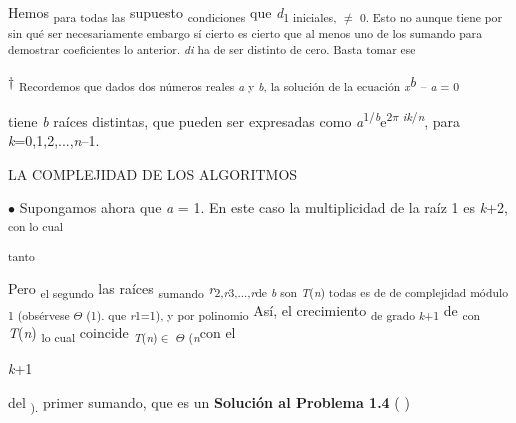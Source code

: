 \documentclass[12pt]{article}
\renewcommand{\_}{\kern-1.5pt\textunderscore\kern-1.5pt}
\begin{document}
\begin{justify}
{\fontsize{10pt}{12.0pt}\selectfont Hemos \textsubscript{para todas las }supuesto \textsubscript{condiciones }que \textit{d}\textsubscript{1 iniciales, $ \neq $  0. Esto no aunque tiene por sin qué ser necesariamente embargo sí cierto es cierto que al menos uno de los sumando para demostrar coeficientes lo anterior. \textit{di }ha de ser distinto de cero. Basta tomar ese }{\fontsize{6pt}{7.2pt}\selectfont † \textsubscript{Recordemos que dados dos números reales \textit{a }y \textit{b}, la solución de la ecuación \textit{x}}\textit{b }\textsubscript{– \textit{a }= 0 }{\fontsize{10pt}{12.0pt}\selectfont tiene \textit{b }raíces distintas, que pueden ser expresadas como \textit{a}\textsuperscript{1/\textit{b}}e\textsuperscript{2$ \pi $ \textit{ik}/\textit{n}}, para \textit{k}=0,1,2,...,\textit{n}–1. \par}\par}\par}
\end{justify}\par

{\fontsize{7pt}{8.4pt}\selectfont LA COMPLEJIDAD DE LOS ALGORITMOS {\fontsize{10pt}{12.0pt} \par}\par}\par

{\fontsize{10pt}{12.0pt}\selectfont $\bullet$  Supongamos ahora que \textit{a }= 1. En este caso la multiplicidad de la raíz 1 es \textit{k}+2, \textsubscript{con lo cual }\par}\par

\textsubscript{tanto }{\fontsize{10pt}{12.0pt}\selectfont Pero \textsubscript{el segundo }las raíces \textsubscript{sumando }\textit{r}\textsubscript{2,\textit{r}3,...,\textit{r}de \textit{b }son \textit{T}(\textit{n}) todas es de de complejidad módulo 1 (obsérvese $ \Theta $ (1). que \textit{r}1=1), y por polinomio }Así, el crecimiento \textsubscript{de grado \textit{k}+1 }de \textsubscript{con }\textit{T}(\textit{n}) \textsubscript{lo cual }coincide \textit{\textsubscript{T}}\textsubscript{(\textit{n})$ \in $ $ \Theta $ (\textit{n}}con el {\fontsize{7pt}{8.4pt}\selectfont \textit{k}+1{\fontsize{10pt}{12.0pt}\selectfont del \textsubscript{). }primer sumando, que es un \textbf{Solución al Problema 1.4 }( ) \par}\par}\par}\par
\end{document}
